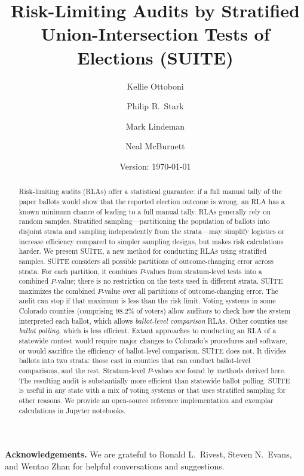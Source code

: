 \documentclass[runningheads]{llncs}
\title{Risk-Limiting Audits by Stratified Union-Intersection Tests of Elections (SUITE)}
\author{
   Kellie Ottoboni\inst{1}\orcidID{0000-0002-9107-3402} \and
   Philip B.~Stark\inst{1}\orcidID{0000-0002-3771-9604} \and
   Mark Lindeman\inst{2}\orcidID{0000-0001-8815-815X} \and
   Neal McBurnett\orcidID{0000-0001-8667-1830} 
}
\institute{
Department of Statistics, University of California, Berkeley, CA, USA \and
Verified Voting Foundation, Philadelphia, PA, USA}
\date{Version: \today}
\begin{document}
\maketitle


\begin{abstract}
Risk-limiting audits (RLAs) offer a statistical guarantee: if a full manual tally of the paper ballots would show that the reported election outcome is wrong, an RLA has a known minimum chance of leading to a full manual tally.
RLAs generally rely on random samples.
Stratified sampling---partitioning the population of ballots into disjoint
strata and sampling independently from the strata---may simplify logistics or increase efficiency compared
to simpler sampling designs, but makes risk calculations harder.
We present SUITE, a new method for conducting RLAs using stratified samples.
SUITE considers all possible partitions of outcome-changing error across strata.
For each partition, it combines $P$-values from stratum-level tests into a combined
$P$-value; there is no restriction on the tests used in different strata.
SUITE maximizes the combined $P$-value over all partitions of outcome-changing error. 
The audit can stop if that maximum is less than the risk limit.
Voting systems in some Colorado counties (comprising 98.2\% of voters)
allow auditors to check how the system interpreted each ballot, 
which allows \emph{ballot-level comparison} RLAs.
Other counties use \emph{ballot polling}, which is less efficient.
Extant approaches to conducting an RLA of a statewide contest would require major changes to 
Colorado's procedures and software, or would sacrifice the efficiency of ballot-level comparison.
SUITE does not. 
It divides ballots into two strata: those cast in counties that can conduct ballot-level comparisons, and the rest.
Stratum-level $P$-values are found by methods derived here.
The resulting audit is substantially more efficient than statewide ballot polling.
SUITE is useful in any state with a mix of voting systems or that uses stratified sampling
for other reasons.
We provide an open-source reference implementation and exemplar calculations in Jupyter notebooks.

\end{abstract}

\noindent
\textbf{Acknowledgements.}
We are grateful to Ronald L.~Rivest, Steven N.~Evans, and Wentao Zhan for helpful conversations and suggestions.
\end{document}
